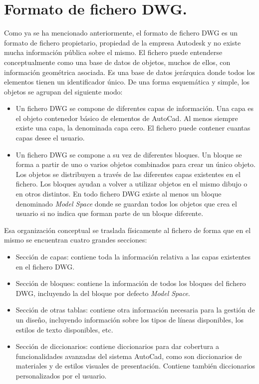 \section{Formato de fichero DWG.}

Como ya se ha mencionado anteriormente, el formato de fichero DWG es un formato de fichero propietario, propiedad de la empresa Autodesk y no existe mucha información pública sobre el mismo. El fichero puede entenderse conceptualmente como una base de datos de objetos, muchos de ellos, con información geométrica asociada. Es una base de datos jerárquica donde todos los elementos tienen un identificador único. De una forma esquemática y simple, los objetos se agrupan del siguiente modo:

\begin{itemize}

\item{Un fichero DWG se compone de diferentes capas de información. Una capa es el objeto contenedor básico de elementos de AutoCad. Al menos siempre existe una capa, la denominada capa cero. El fichero puede contener cuantas capas desee el usuario.}

\item{Un fichero DWG se compone a su vez de diferentes bloques. Un bloque se forma a partir de uno o varios objetos combinados para crear un único objeto. Los objetos se distribuyen a través de las diferentes capas existentes en el fichero. Los bloques ayudan a volver a utilizar objetos en el mismo dibujo o en otros distintos. En todo fichero DWG existe al menos un bloque denominado \textit{Model Space} donde se guardan todos los objetos que crea el usuario si no indica que forman parte de un bloque diferente.}

\end{itemize}

Esa organización conceptual se traslada físicamente al fichero de forma que en el mismo se encuentran cuatro grandes secciones:

\begin{itemize}

\item{Sección de capas: contiene toda la información relativa a las capas existentes en el fichero DWG.}

\item{Sección de bloques: contiene la información de todos los bloques del fichero DWG, incluyendo la del bloque por defecto \textit{Model Space}.}

\item{Sección de otras tablas: contiene otra información necesaria para la gestión de un diseño, incluyendo información sobre los tipos de líneas disponibles, los estilos de texto disponibles, etc.}

\item{Sección de diccionarios: contiene diccionarios para dar cobertura a funcionalidades avanzadas del sistema AutoCad, como son diccionarios de materiales y de estilos visuales de presentación. Contiene también diccionarios personalizados por el usuario.}

\end{itemize}

